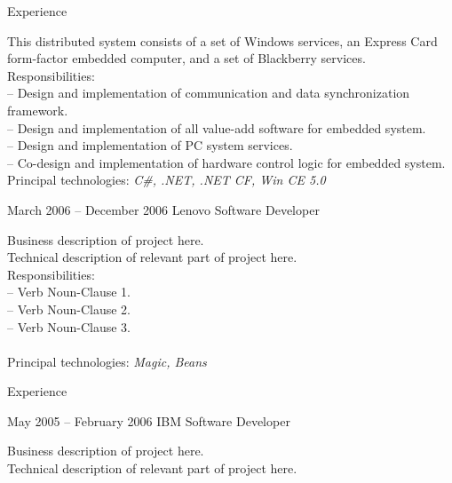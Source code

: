\documentclass[letterpaper, 11pt]{article}
\begin{document}
\begin{resume}
\begin{category}{Experience}
\begin{block}
                This distributed system consists of a set of Windows services, an Express Card
                form-factor embedded computer, and a set of Blackberry services.
                \\[1ex]
                Responsibilities: \\
                -- Design and implementation of communication and data synchronization framework. \\
                -- Design and implementation of all value-add software for embedded system. \\
                -- Design and implementation of PC system services. \\
                -- Co-design and implementation of hardware control logic for embedded system.
                \\[1ex]
                Principal technologies: \emph{ C\#, .NET, .NET CF, Win CE 5.0 }
            \end{block}
            \begin{block}
                 {March 2006 -- December 2006}
                         {Lenovo}           {Software Developer}
                \par
                Business description of project here.
                \\[1ex]
                Technical description of relevant part of project here.
                \\[1ex]
                Responsibilities: \\
                -- Verb Noun-Clause 1. \\
                -- Verb Noun-Clause 2. \\
                -- Verb Noun-Clause 3. \\
                \\[1ex]
                Principal technologies: \emph{ Magic, Beans }
            \end{block}
        \end{category}
        \begin{category}{Experience}
            \begin{block}
                 {May 2005 -- February 2006}
                         {IBM}                               {Software Developer}
                \par
                Business description of project here.
                \\[1ex]
                Technical description of relevant part of project here.

\end{block}
\end{category}
\end{resume}
\end{document}
